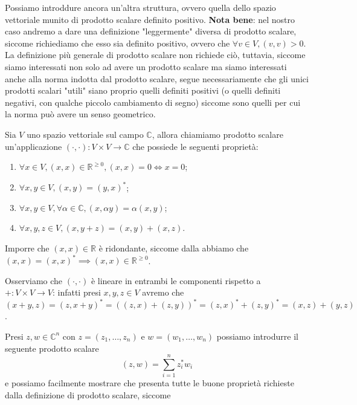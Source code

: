 \documentclass[12pt, twoside, italian, openany]{book}
\begin{document}
	Possiamo introddure ancora un'altra struttura, ovvero quella dello spazio vettoriale munito di prodotto scalare definito positivo. \textbf{Nota bene}: nel nostro caso
	andremo a dare una definizione "leggermente" diversa di prodotto scalare, siccome richiediamo che esso sia definito positivo, ovvero che $\forall v \in V, (v, v) > 0$. La definizione più generale di prodotto
	scalare non richiede ciò, tuttavia, siccome siamo interessati non solo ad avere un prodotto scalare ma siamo interessati anche alla norma indotta dal prodotto scalare, segue necessariamente che gli unici prodotti scalari "utili"
	siano proprio quelli definiti positivi (o quelli definiti negativi, con qualche piccolo cambiamento di segno) siccome sono quelli per cui la norma può avere un senso geometrico.
	\begin{definition}
		Sia $V$ uno spazio vettoriale sul campo $\mathbb{C}$, allora chiamiamo prodotto scalare un'applicazione $(\cdot, \cdot): V \times V \to \mathbb{C}$ che possiede le seguenti proprietà:
			\begin{enumerate}[label=\protect\circled{\arabic*}]
				\item $\forall x \in V, (x, x) \in \mathbb{R}^{\geq 0}, (x, x) = 0 \iff x = 0$;
				\item $\forall x, y \in V, (x, y) = (y,x)^*$;
				\item $\forall x,y \in V, \forall \alpha \in \mathbb{C}, (x, \alpha y) = \alpha(x, y)$;
				\item $\forall x, y, z \in V, (x, y+z) = (x, y) + (x, z)$.
			\end{enumerate}
	\end{definition}
	\begin{remark}
		Imporre che $(x, x) \in \mathbb{R}$ è ridondante, siccome dalla  abbiamo che $(x, x) = (x, x)^{*} \implies (x, x) \in \mathbb{R}^{\geq 0}$.
	\end{remark}
	\begin{remark}
		Osserviamo che $(\cdot, \cdot)$ è lineare in entrambi le componenti rispetto a $+: V \times V \to V$: infatti presi $x, y, z \in V$ avremo che $(x + y, z) = (z, x+y)^* = ((z, x) + (z, y))^* = (z, x)^* + (z, y)^*=(x, z) + (y, z)$.
	\end{remark}
	Presi $z, w \in \mathbb{C}^n$ con $z = (z_1, \ldots, z_n)$ e $w = (w_1, \ldots, w_n)$ possiamo introdurre il seguente prodotto scalare
	$$
		(z, w) = \sum_{i=1}^n z_i^* w_i
	$$
	e possiamo facilmente mostrare che presenta tutte le buone proprietà richieste dalla definizione di prodotto scalare, siccome
\end{document}
